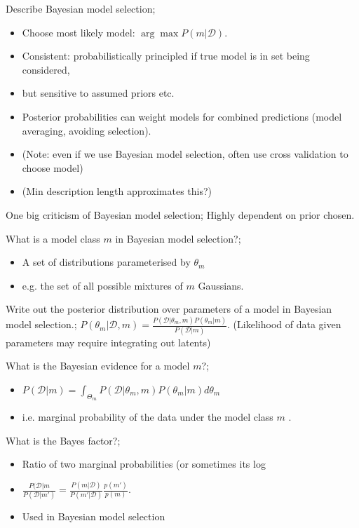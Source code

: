 \documentclass{article}
\begin{document}
Describe Bayesian model selection; \begin{itemize} \item Choose most likely model: $\arg\max P(m|\mathcal{D})$.  \item Consistent: probabilistically principled if true model is in set being considered, \item but sensitive to assumed priors etc.  \item Posterior probabilities can weight models for combined predictions (model averaging, avoiding selection).  \item (Note: even if we use Bayesian model selection, often use cross validation to choose model) \item (Min description length approximates this?) \end{itemize}

One big criticism of Bayesian model selection; Highly dependent on prior chosen.

What is a model class $m$ in Bayesian model selection?; \begin{itemize} \item A set of distributions parameterised by $\theta_m$ \item e.g. the set of all possible mixtures of $m$ Gaussians.  \end{itemize}

Write out the posterior distribution over parameters of a model in Bayesian model selection.; $P(\theta_m|\mathcal{D}, m) = \frac{P(\mathcal{D}|\theta_m, m)P(\theta_m|m)}{P(\mathcal{D}|m)}$. (Likelihood of data given parameters may require integrating out latents)

What is the Bayesian evidence for a model $m$?; \begin{itemize} \item $P(\mathcal{D}|m)=\int_{\Theta_m}P(\mathcal{D}|\theta_m, m)P(\theta_m|m)d\theta_m$ \item i.e. marginal probability of the data under the model class $m$ .  \end{itemize}

What is the Bayes factor?; \begin{itemize} \item Ratio of two marginal probabilities (or sometimes its log \item $\frac{P(\mathcal{D}|m}{P(\mathcal{D}|m')}=\frac{P(m|\mathcal{D})}{P(m'|\mathcal{D})}\frac{p(m')}{p(m)}$.  \item Used in Bayesian model selection \end{itemize}
\end{document}
